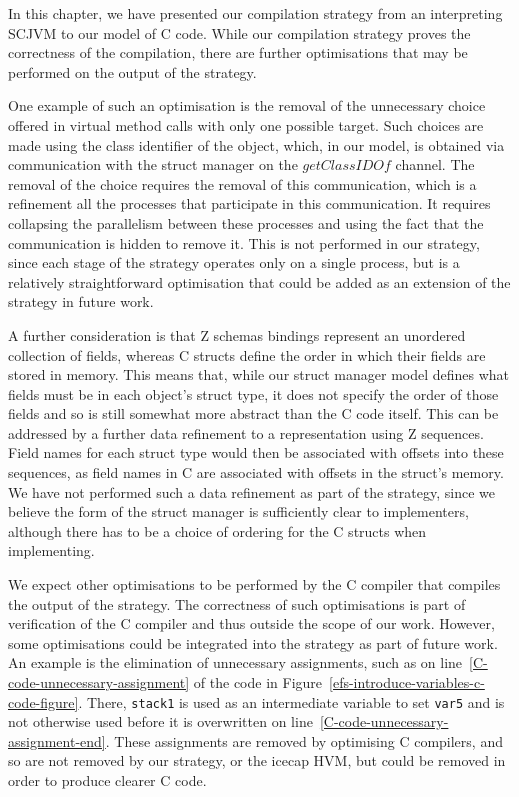 In this chapter, we have presented our compilation strategy from an
interpreting SCJVM to our model of C code. While our compilation
strategy proves the correctness of the compilation, there are further
optimisations that may be performed on the output of the strategy.

One example of such an optimisation is the removal of the unnecessary
choice offered in virtual method calls with only one possible target.
Such choices are made using the class identifier of the object, which,
in our model, is obtained via communication with the struct manager on
the $getClassIDOf$ channel. 
The removal of the choice requires the removal of this communication,
which is a refinement all the processes that participate in this
communication. 
It requires collapsing the parallelism between these processes and
using the fact that the communication is hidden to remove it. 
This is not performed in our strategy, since each stage of the
strategy operates only on a single process, but is a relatively
straightforward optimisation that could be added as an extension of
the strategy in future work.

A further consideration is that Z schemas bindings represent an
unordered collection of fields, whereas C structs define the order in
which their fields are stored in memory.
This means that, while our struct manager model defines what fields
must be in each object's struct type, it does not specify the order of
those fields and so is still somewhat more abstract than the C code
itself.
This can be addressed by a further data refinement to a representation
using Z sequences.
Field names for each struct type would then be associated with offsets
into these sequences, as field names in C are associated with offsets
in the struct's memory.
We have not performed such a data refinement as part of the strategy,
since we believe the form of the struct manager is sufficiently clear
to implementers, although there has to be a choice of ordering for the
C structs when implementing.

We expect other optimisations to be performed by the C compiler that
compiles the output of the strategy.
The correctness of such optimisations is part of verification of the C
compiler and thus outside the scope of our work.
However, some optimisations could be integrated into the strategy as
part of future work.
An example is the elimination of unnecessary assignments, such as on
line~\ref{C-code-unnecessary-assignment} of the code in
Figure~\ref{efs-introduce-variables-c-code-figure}.
There, \texttt{stack1} is used as an intermediate variable to set
\texttt{var5} and is not otherwise used before it is overwritten on
line~\ref{C-code-unnecessary-assignment-end}.
These assignments are removed by optimising C compilers, and so are
not removed by our strategy, or the icecap HVM, but could be removed
in order to produce clearer C code.

